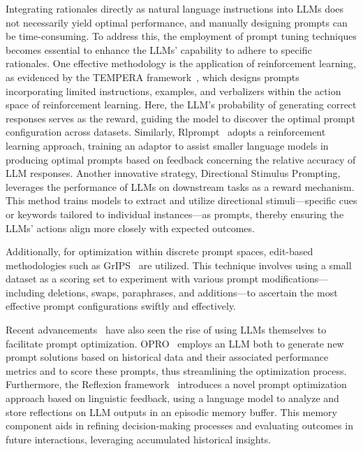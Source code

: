 Integrating rationales directly as natural language instructions into LLMs does not necessarily yield optimal performance, and manually designing prompts can be time-consuming. To address this, the employment of prompt tuning techniques becomes essential to enhance the LLMs' capability to adhere to specific rationales. One effective methodology is the application of reinforcement learning, as evidenced by the TEMPERA framework~\cite{zhang2022tempera}, which designs prompts incorporating limited instructions, examples, and verbalizers within the action space of reinforcement learning. Here, the LLM's probability of generating correct responses serves as the reward, guiding the model to discover the optimal prompt configuration across datasets. Similarly, Rlprompt~\cite{deng2022rlprompt} adopts a reinforcement learning approach, training an adaptor to assist smaller language models in producing optimal prompts based on feedback concerning the relative accuracy of LLM responses. Another innovative strategy, Directional Stimulus Prompting, leverages the performance of LLMs on downstream tasks as a reward mechanism. This method trains models to extract and utilize directional stimuli—specific cues or keywords tailored to individual instances—as prompts, thereby ensuring the LLMs' actions align more closely with expected outcomes.

Additionally, for optimization within discrete prompt spaces, edit-based methodologies such as GrIPS~\cite{prasad2022grips} are utilized. This technique involves using a small dataset as a scoring set to experiment with various prompt modifications—including deletions, swaps, paraphrases, and additions—to ascertain the most effective prompt configurations swiftly and effectively.

Recent advancements~\cite{zhou2022large, pryzant2023automatic} have also seen the rise of using LLMs themselves to facilitate prompt optimization. OPRO~\cite{yang2024large_1} employs an LLM both to generate new prompt solutions based on historical data and their associated performance metrics and to score these prompts, thus streamlining the optimization process. Furthermore, the Reflexion framework~\cite{shinn2024reflexion} introduces a novel prompt optimization approach based on linguistic feedback, using a language model to analyze and store reflections on LLM outputs in an episodic memory buffer. This memory component aids in refining decision-making processes and evaluating outcomes in future interactions, leveraging accumulated historical insights.

